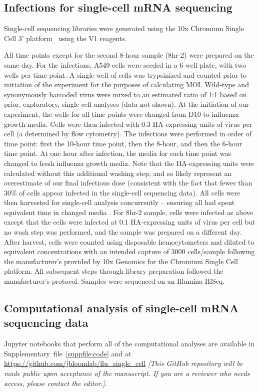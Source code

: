 \documentclass[9pt,lineno]{elife}
\newcommand{\jdbcomment}[1]{\emph{\color{red} [#1]}}
\begin{document}
\subsection{Infections for single-cell mRNA sequencing}
Single-cell sequencing libraries were generated using the 10x Chromium Single Cell 3' platform~\citep{zheng2017massively} using the V1 reagents.

All time points except for the second 8-hour sample (8hr-2) were prepared on the same day.
For the infections, A549 cells were seeded in a 6-well plate, with two wells per time point. 
A single well of cells was trypsinized and counted prior to initiation of the experiment for the purposes of calculating MOI.
Wild-type and synonymously barcoded virus were mixed to an estimated ratio of 1:1 based on prior, exploratory, single-cell analyses (data not shown). 
At the initiation of our experiment, the wells for all time points were changed from D10 to influenza growth media.
Cells were then infected with 0.3 HA-expressing units of virus per cell (a determined by flow cytometry).
The infections were performed in order of time point: first the 10-hour time point, then the 8-hour, and then the 6-hour time point.
At one hour after infection, the media for each time point was changed to fresh influenza growth media.
Note that the HA-expressing units were calculated without this additional washing step, and so likely represent an overestimate of our final infectious dose (consistent with the fact that fewer than 30\% of cells appear infected in the single-cell sequencing data).
All cells were then harvested for single-cell analysis concurrently -- ensuring all had spent equivalent time in changed media .
For 8hr-2 sample, cells were infected as above except that the cells were infected at 0.1 HA-expressing units of virus per cell but no wash step was performed, and the sample was prepared on a different day.
After harvest, cells were counted using disposable hemocytometers and diluted to equivalent concentrations with an intended capture of 3000 cells/sample following the manufacturer's provided by 10x Genomics for the Chromium Single Cell platform.
All subsequent steps through library preparation followed the manufacturer's protocol.
Samples were sequenced on an Illumina HiSeq. 

\subsection{Computational analysis of single-cell mRNA sequencing data}
Jupyter notebooks that perform all of the computational analyses are available in Supplementary~file~\ref{suppfile:code} and at \url{https://github.com/jbloomlab/flu_single_cell} \jdbcomment{This GitHub repository will be made public upon acceptance of the manuscript. If you are a reviewer who needs access, please contact the editor.}.
\end{document}
